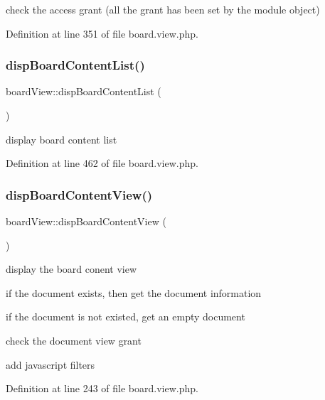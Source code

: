 check the access grant (all the grant has been set by the module object)

Definition at line 351 of file board.\+view.\+php.

\hypertarget{classboardView_ae35d48f5a226160508dfacf1b3c2c249}{}\label{classboardView_ae35d48f5a226160508dfacf1b3c2c249} 
\subsubsection{\texorpdfstring{disp\+Board\+Content\+List()}{dispBoardContentList()}}
{\footnotesize\ttfamily board\+View\+::disp\+Board\+Content\+List (\begin{DoxyParamCaption}{ }\end{DoxyParamCaption})}



display board content list 



Definition at line 462 of file board.\+view.\+php.

\hypertarget{classboardView_aac8ccefc2704d01636b70480d8dd58d7}{}\label{classboardView_aac8ccefc2704d01636b70480d8dd58d7} 
\subsubsection{\texorpdfstring{disp\+Board\+Content\+View()}{dispBoardContentView()}}
{\footnotesize\ttfamily board\+View\+::disp\+Board\+Content\+View (\begin{DoxyParamCaption}{ }\end{DoxyParamCaption})}



display the board conent view 

if the document exists, then get the document information

if the document is not existed, get an empty document

check the document view grant

add javascript filters

Definition at line 243 of file board.\+view.\+php.

\hypertarget{classboardView_a21c4b3d619a379c091db504446ba16e1}{}\label{classboardView_a21c4b3d619a379c091db504446ba16e1} 
